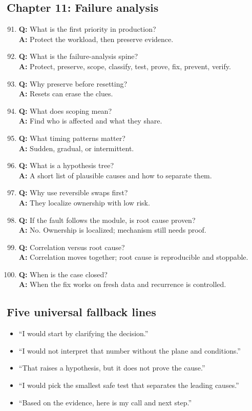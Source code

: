 \subsection{Chapter 11: Failure analysis}
\begin{enumerate}
\setcounter{enumi}{90}
\item \textbf{Q:} What is the first priority in production?\\
\textbf{A:} Protect the workload, then preserve evidence.
\item \textbf{Q:} What is the failure-analysis spine?\\
\textbf{A:} Protect, preserve, scope, classify, test, prove, fix, prevent,
verify.
\item \textbf{Q:} Why preserve before resetting?\\
\textbf{A:} Resets can erase the clues.
\item \textbf{Q:} What does scoping mean?\\
\textbf{A:} Find who is affected and what they share.
\item \textbf{Q:} What timing patterns matter?\\
\textbf{A:} Sudden, gradual, or intermittent.
\item \textbf{Q:} What is a hypothesis tree?\\
\textbf{A:} A short list of plausible causes and how to separate them.
\item \textbf{Q:} Why use reversible swaps first?\\
\textbf{A:} They localize ownership with low risk.
\item \textbf{Q:} If the fault follows the module, is root cause proven?\\
\textbf{A:} No. Ownership is localized; mechanism still needs proof.
\item \textbf{Q:} Correlation versus root cause?\\
\textbf{A:} Correlation moves together; root cause is reproducible and
stoppable.
\item \textbf{Q:} When is the case closed?\\
\textbf{A:} When the fix works on fresh data and recurrence is controlled.
\end{enumerate}

\subsection{Five universal fallback lines}
\begin{itemize}
\item ``I would start by clarifying the decision.''
\item ``I would not interpret that number without the plane and conditions.''
\item ``That raises a hypothesis, but it does not prove the cause.''
\item ``I would pick the smallest safe test that separates the leading causes.''
\item ``Based on the evidence, here is my call and next step.''
\end{itemize}

\normalsize
